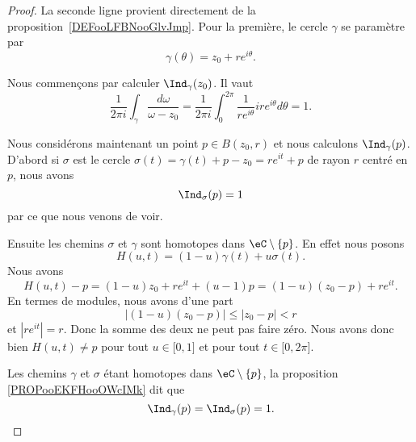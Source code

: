 \begin{proof}
	La seconde ligne provient directement de la proposition~\ref{DEFooLFBNooGlvJmp}. Pour la première, le cercle \( \gamma\) se paramètre par
	\begin{equation}
		\gamma(\theta)=z_0+r e^{i\theta}.
	\end{equation}

	Nous commençons par calculer \( \Ind_{\gamma}(z_0)\). Il vaut
	\begin{equation}
		\frac{1}{ 2\pi i}\int_{\gamma}\frac{ d\omega }{ \omega-z_0 }=\frac{1}{ 2\pi i}\int_0^{2\pi}\frac{1}{ r e^{i\theta} }ir e^{i\theta}d\theta=1.
	\end{equation}

	Nous considérons maintenant un point \( p\in B(z_0,r)\) et nous calculons \( \Ind_{\gamma}(p)\). D'abord si \( \sigma\) est le cercle \( \sigma(t)=\gamma(t)+p-z_0=re^{it}+p\) de rayon \( r\) centré en \( p\), nous avons
	\begin{equation}
		\Ind_{\sigma}(p)=1
	\end{equation}
	par ce que nous venons de voir.

	Ensuite les chemins \( \sigma\) et \( \gamma\) sont homotopes dans \( \eC\setminus\{ p \}\). En effet nous posons
	\begin{equation}
		H(u,t)=(1-u)\gamma(t)+u\sigma(t).
	\end{equation}
	Nous avons
	\begin{equation}
		H(u,t)-p=(1-u)z_0+re^{it}+(u-1)p=(1-u)(z_0-p)+re^{it}.
	\end{equation}
	En termes de modules, nous avons d'une part
	\begin{equation}
		| (1-u)(z_0-p) |\leq | z_0-p |<r
	\end{equation}
	et \( | re^{it} |=r\). Donc la somme des deux ne peut pas faire zéro. Nous avons donc bien \( H(u,t)\neq p\) pour tout \( u\in \mathopen[ 0,1\mathclose]\) et pour tout \( t\in\mathopen[ 0,2\pi\mathclose]\).

	Les chemins \( \gamma\) et \( \sigma\) étant homotopes dans \( \eC\setminus\{ p \}\), la proposition \ref{PROPooEKFHooOWcIMk} dit que
	\begin{equation}
		\Ind_{\gamma}(p)=\Ind_{\sigma}(p)=1.
	\end{equation}
\end{proof}

